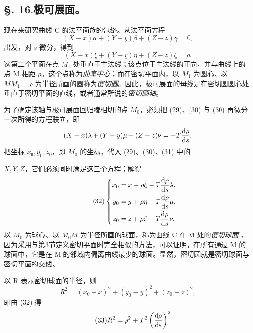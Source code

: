 \subsection*{\S. 16.\quad 极可展面。}
现在来研究曲线 C 的法平面族的包络。从法平面方程
\begin{equation}\tag{29}
(X-x)\alpha+(Y-y)\beta+(Z-z)\gamma=0,
\end{equation}
出发，对 \(s\) 微分，得到
\begin{equation}\tag{30}
(X-x)\xi+(Y-y)\eta+(Z-z)\zeta=\rho.
\end{equation}
这第二个平面在点 \(M_1\) 处垂直于主法线；该点位于主法线的正向，并与曲线上的点 M 相距 \(\rho\)。这个点称为\emph{曲率中心}；而在密切平面内，以 \(M_1\) 为圆心、以 \(MM_1=\rho\) 为半径所画的圆称为\emph{密切圆}。因此，极可展面的母线是在密切圆圆心处垂直于密切平面的直线，或者通常所说的\emph{密切圆轴}。

为了确定该轴与极可展面回归棱相切的点 \(M_0\)，必须把 (29)、(30) 与 (30) 再微分一次所得的方程联立，即
\[
(X-x)\lambda+(Y-y)\mu+(Z-z)\nu=-T\frac{\mathrm{d}\rho}{\mathrm{d} s}.
\]
把坐标 \(x_0,y_0,z_0\)，即 \(M_0\) 的坐标，代入 (29)、(30)、(31) 中的

\(X,Y,Z\)，它们必须同时满足这三个方程；解得
\begin{equation}\tag{32}
\left\{
\begin{aligned}
x_0&=x+\rho\xi-T\frac{\mathrm{d}\rho}{\mathrm{d} s}\lambda,\\
y_0&=y+\rho\eta-T\frac{\mathrm{d}\rho}{\mathrm{d} s}\mu,\\
z_0&=z+\rho\zeta-T\frac{\mathrm{d}\rho}{\mathrm{d} s}\nu.
\end{aligned}\right.
\end{equation}
以 \(M_0\) 为球心、以 \(M_0M\) 为半径所画的球面，称为曲线 C 在 M 处的\emph{密切球面}；因为采用与第3节定义密切平面时完全相似的方法，可以证明，在所有通过 M 的球面中，它是在 M 的邻域内偏离曲线最少的球面。显然，密切圆就是密切球面与密切平面的交线。

以 R 表示密切球面的半径，则
\[
R^2=(x_0-x)^2+(y_0-y)^2+(z_0-z)^2,
\]
即由 (32) 得
\begin{equation}\tag{33}
R^2=\rho^2+T^2\left(\frac{\mathrm{d}\rho}{\mathrm{d} s}\right)^2.
\end{equation}
